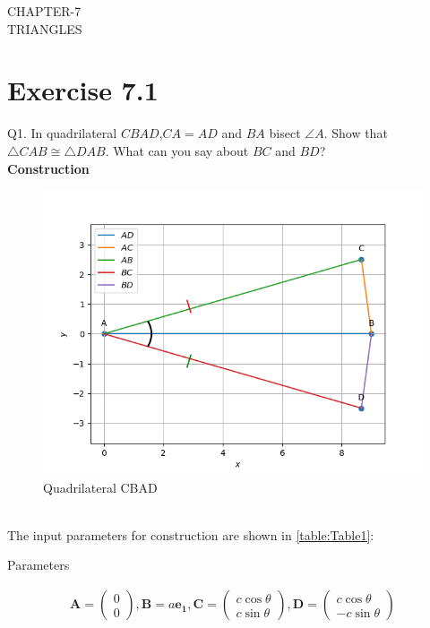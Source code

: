 \documentclass{article}
\newcommand{\myvec}[1]{\ensuremath{\begin{pmatrix}#1\end{pmatrix}}}
\let\vec\mathbf
\begin{document}
\begin{center}
        \textbf\large{CHAPTER-7 \\ TRIANGLES}
\end{center}
\section{Exercise 7.1}
Q1. In quadrilateral $CBAD$,$CA = AD$ and $BA$ bisect $\angle{A}$. Show that $\triangle{CAB} \cong \triangle{DAB}$. What can you say about $BC$ and $BD$? \\
\textbf{Construction}\\
\begin{figure}[h]
	\begin{center}
		\includegraphics[width=\columnwidth]{figs/graph.png}
	\end{center}
	\caption{Quadrilateral CBAD}
	\label{figure:Fig1}
\end{figure}
\pagebreak
\\ The input parameters for construction are shown in \ref{table:Table1}:\\
\begin{table}[h]
	  \centering
	  
	  \caption{Parameters}
	  \label{table:Table1}
\end{table}
\begin{align}
	\vec{A} = \myvec{0\\0},\vec{B} = a\vec{e_1},\vec{C} = \myvec{c\cos\theta\\c\sin\theta},\vec{D} = \myvec{c\cos\theta\\-c\sin\theta}
\end{align}
\end{document}
